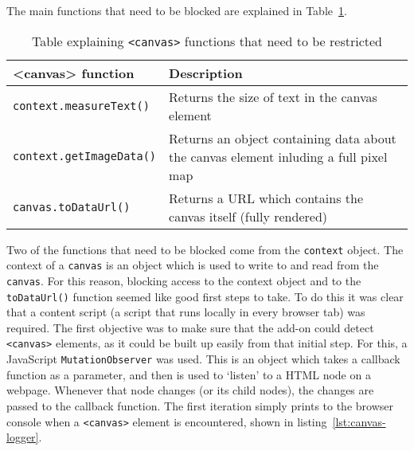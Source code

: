 The main functions that need to be blocked are explained in Table~\ref{tab:canvas-methods}.

\begin{table}[h!]
\centering
\begin{tabular}{| p{6cm} | p{8cm} |}
    \hline
    \textbf{<canvas> function} & \textbf{Description} \\ \hline
    \texttt{context.measureText()} & {Returns the size of text in the canvas element} \\ \hline
    \texttt{context.getImageData()} & {Returns an object containing data about \newline the canvas element inluding a full pixel map} \\ \hline
    \texttt{canvas.toDataUrl()} & {Returns a URL which contains the canvas \newline itself (fully rendered)} \\
    \hline
\end{tabular}
\caption{Table explaining \texttt{<canvas>} functions that need to be restricted}
\label{tab:canvas-methods}
\end{table}

Two of the functions that need to be blocked come from the \texttt{context} object.
The context of a \texttt{canvas} is an object which is used to write to and read from the \texttt{canvas}.
For this reason, blocking access to the context object and to the \texttt{toDataUrl()} function seemed like good first steps to take.
To do this it was clear that a content script (a script that runs locally in every browser tab) was required.
The first objective was to make sure that the add-on could detect \texttt{<canvas>} elements, as it could be built up easily from that initial step.
For this, a JavaScript \texttt{MutationObserver} was used.
This is an object which takes a callback function as a parameter, and then is used to `listen' to a HTML node on a webpage.
Whenever that node changes (or its child nodes), the changes are passed to the callback function.
The first iteration simply prints to the browser console when a \texttt{<canvas>} element is encountered, shown in listing~\ref{lst:canvas-logger}.

